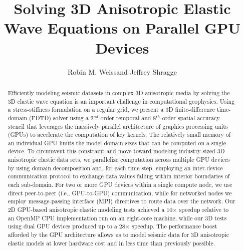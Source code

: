 \title{Solving 3D Anisotropic Elastic Wave Equations on Parallel GPU Devices}

\renewcommand{\thefootnote}{\fnsymbol{footnote}} 



\author{Robin M. Weiss\footnotemark[1] and Jeffrey Shragge\footnotemark[1]}

\address{
\footnotemark[1]Centre for Petroleum Geoscience and CO$_2$ Sequestration,\\
The University of Western Australia,\\
35 Stirling Highway, Crawley WA 6008, Australia \\
}

\maketitle

\begin{abstract}
Efficiently modeling seismic datasets in complex 3D anisotropic media by solving the 3D elastic wave equation is an important challenge in computational geophysics.  Using a stress-stiffness formulation on a regular grid, we present a 3D finite-difference time-domain (FDTD) solver using a 2$^{nd}$-order temporal and 8$^{th}$-order spatial accuracy stencil that leverages the massively parallel architecture of graphics processing units (GPUs) to accelerate the computation of key kernels.  The relatively small memory of an individual GPU limits the model domain sizes that can be computed on a single device.  To circumvent this constraint and move toward modeling industry-sized 3D anisotropic elastic data sets, we parallelize computation across multiple GPU devices by using domain decomposition and, for each time step, employing an inter-device communication protocol to exchange data values falling within interior boundaries of each sub-domain.  For two or more GPU devices within a single compute node, we use direct peer-to-peer (i.e., GPU-to-GPU) communication, while for networked nodes we employ message-passing interface (MPI) directives to route data over the network.  Our 2D GPU-based anisotropic elastic modeling tests achieved a 10$\times$ speedup relative to an OpenMP CPU implementation run on an eight-core machine, while our 3D tests using dual GPU devices produced up to a 28$\times$ speedup.  The performance boost afforded by the GPU architecture allows us to model seismic data for 3D anisotropic elastic models at lower hardware cost and in less time than previously possible.
\end{abstract}

